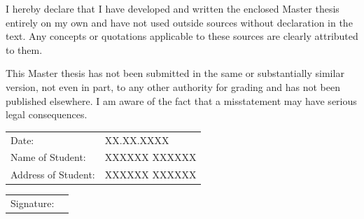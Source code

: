 



{I hereby declare that I have developed and written the enclosed Master thesis entirely on my own and have not used outside sources without declaration in the text. Any concepts or quotations applicable to these sources are clearly attributed to them.\par}
\vspace{0.7cm}
{This Master thesis has not been submitted in the same or substantially similar version, not even in part, to any other authority for grading and has not been published elsewhere. I am aware of the fact that a misstatement may have serious legal consequences.\par}
\vspace{0.7cm}


\vspace{0.5cm}
\begin{table}[h]
\raggedright
\setlength{\extrarowheight}{.5em}
\begin{tabular}{ll}
Date:               & XX.XX.XXXX                       \\
Name of Student:    & XXXXXX XXXXXX               \\
Address of Student: & XXXXXX XXXXXX  
\end{tabular}
\end{table}

\vspace{2.5cm}
\begin{table}[h]
\raggedright
\begin{tabular}{@{}p{.65in}p{2.25in}@{}}
Signature: & \hrulefill
\end{tabular}
\end{table}



